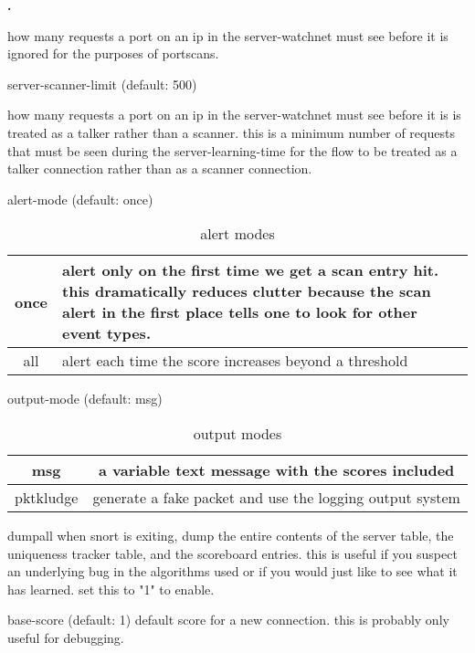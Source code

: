 \documentclass[english]{report}
\newcounter{slistnum}
\newenvironment{slist}{
    \begin{list}{
        {
            \bf \arabic{slistnum}.
        } 
    }{
        \usecounter{slistnum} 
    }
}{
    \end{list} 
}
\begin{document}
\begin{slist}
how many requests a port on an ip in the server-watchnet must see
before it is ignored for the purposes of portscans.

\item server-scanner-limit (default: 500)

how many requests a port on an ip in the server-watchnet must see before it is
is treated as a talker rather than a scanner.  this is a minimum number of
requests that must be seen during the server-learning-time for the flow to be
treated as a talker connection rather than as a scanner connection.

\item alert-mode (default: once)

\begin{table}[!hbpt]
\caption{alert modes}
\begin{center}\begin{tabular}{|c|p{3.5in}|}
\hline 
once & 
alert only on the first time we get a scan entry hit.  this dramatically reduces clutter because the scan alert in the first place tells one to look for other event types.  
\\
\hline 
all & alert each time the score increases beyond a threshold \\
\hline
\end{tabular}\end{center}
\end{table}

\item output-mode (default: msg)

\begin{table}[!hbpt]
\caption{output modes}
\begin{center}\begin{tabular}{|c|c|}
\hline 
msg & a variable text message with the scores included  \\
\hline
pktkludge & generate a fake packet and use the logging output system \\
\hline
\end{tabular}\end{center}
\end{table}

\item dumpall
when snort is exiting, dump the entire contents of the server table,
the uniqueness tracker table, and the scoreboard entries.  this is
useful if you suspect an underlying bug in the algorithms used or if
you would just like to see what it has learned. set this to "1" to
enable.
            
\item base-score (default: 1)
default score for a new connection. this is probably only useful for
debugging.

\end{slist}
\end{document}
